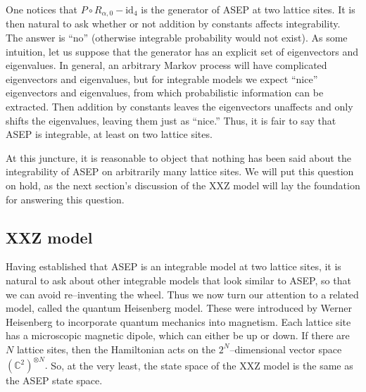 \documentclass{ximera}
\begin{document}
One notices that \(P\circ R_{\alpha,0}-\mathrm{id}_4\) is the generator of ASEP at two lattice sites. It is then
natural to ask whether or not addition by constants affects integrability. The answer is ``no'' (otherwise 
integrable probability would not exist). As some intuition, let us suppose that the generator has an 
explicit set of eigenvectors and eigenvalues. In general, an arbitrary Markov process will have 
complicated eigenvectors and eigenvalues, but for integrable models we expect ``nice'' eigenvectors
and eigenvalues, from which probabilistic information can be extracted. Then addition by constants leaves
the eigenvectors unaffects and only shifts the eigenvalues, leaving them just as ``nice.'' Thus, 
it is fair to say that ASEP is integrable, at least on two lattice sites. 

At this juncture, it is reasonable to object that nothing has been said about the integrability of ASEP
on arbitrarily many lattice sites. We will put this question on hold, as the next section's discussion
of the XXZ model will lay the foundation for answering this question.

\subsection{XXZ model}
Having established that ASEP is an integrable model at two lattice sites, it is natural to ask about
other integrable models that look similar to ASEP, so that we can avoid re--inventing the wheel. Thus we 
now turn our attention to a related model, called the quantum Heisenberg model. These were introduced
by Werner Heisenberg to incorporate quantum mechanics into magnetism. Each lattice site has a microscopic
magnetic dipole, which can either be up or down. If there are \(N\) lattice sites, 
then the Hamiltonian acts on the \(2^N\)--dimensional vector space \((\mathbb{C}^2)^{\otimes N}.\)
So, at the very least, the state space of the XXZ model is the same as the ASEP state space. 
\end{document}
